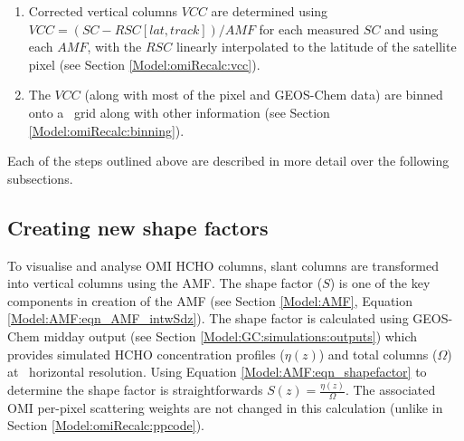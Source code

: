 \begin{enumerate}
\begin{enumerate}
        \item These corrections are binned by satellite detector (track: 1-60), and latitude (0.36\degr; 500 latitudes from 90{\degr}S to 90{\degr}N).
        \item The median entry of each bin is determined and this forms the $RSC[lat,track]$ (e.g., Figure \ref{Model:omiRecalc:RSC:fig_track_correction_interpolations}).
      \end{enumerate}
      \item Corrected vertical columns $VCC$ are determined using $VCC = (SC - RSC[lat,track] )/AMF$ for each measured $SC$ and using each $AMF$, with the $RSC$ linearly interpolated to the latitude of the satellite pixel (see Section \ref{Model:omiRecalc:vcc}).
      \item The $VCC$ (along with most of the pixel and GEOS-Chem data) are binned onto a \highhr ~grid along with other information (see Section \ref{Model:omiRecalc:binning}).
    \end{enumerate}
 
    Each of the steps outlined above are described in more detail over the following subsections.
      
  
  \subsection{Creating new shape factors}
    \label{Model:omiRecalc:shape_factors}
    To visualise and analyse OMI HCHO columns, slant columns are transformed into vertical columns using the AMF.
    The shape factor ($S$) is one of the key components in creation of the AMF (see Section \ref{Model:AMF}, Equation \ref{Model:AMF:eqn_AMF_intwSdz}).
    The shape factor is calculated using GEOS-Chem midday output (see Section \ref{Model:GC:simulations:outputs}) which provides simulated HCHO concentration profiles ($\eta(z)$) and total columns ($\Omega$) at \lowhr ~horizontal resolution.
    Using Equation \ref{Model:AMF:eqn_shapefactor} to determine the shape factor is straightforwards $S(z) = \frac{\eta(z)}{\Omega}$.
    The associated OMI per-pixel scattering weights are not changed in this calculation (unlike in Section \ref{Model:omiRecalc:ppcode}).
    
